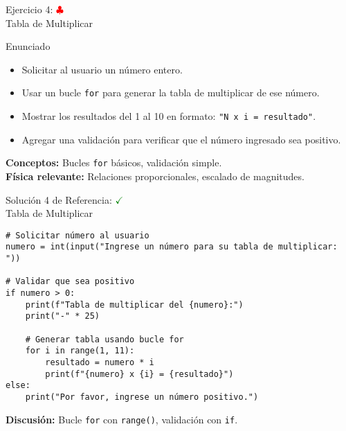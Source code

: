 \documentclass[10pt]{beamer}
\begin{document}
\begin{frame}{Ejercicio 4: \hfill \textcolor{red}{$\clubsuit$} \\ Tabla de Multiplicar}
  \begin{block}{Enunciado}
    \begin{itemize}
      \item Solicitar al usuario un número entero.
      \item Usar un bucle \texttt{for} para generar la tabla de multiplicar de ese número.
      \item Mostrar los resultados del 1 al 10 en formato: \texttt{"N x i = resultado"}.
      \item Agregar una validación para verificar que el número ingresado sea positivo.
    \end{itemize}
  \end{block}
  
  \textbf{Conceptos:} Bucles \texttt{for} básicos, validación simple.
  \\
  \textbf{Física relevante:} Relaciones proporcionales, escalado de magnitudes.
\end{frame}

\begin{frame}[fragile]{Solución 4 de Referencia: \hfill \textcolor{green}{$\checkmark$} \\ Tabla de Multiplicar}
\begin{verbatim}
# Solicitar número al usuario
numero = int(input("Ingrese un número para su tabla de multiplicar: "))

# Validar que sea positivo
if numero > 0:
    print(f"Tabla de multiplicar del {numero}:")
    print("-" * 25)
    
    # Generar tabla usando bucle for
    for i in range(1, 11):
        resultado = numero * i
        print(f"{numero} x {i} = {resultado}")
else:
    print("Por favor, ingrese un número positivo.")
\end{verbatim}
\textbf{Discusión:} Bucle \texttt{for} con \texttt{range()}, validación con \texttt{if}.
\end{frame}
\end{document}
